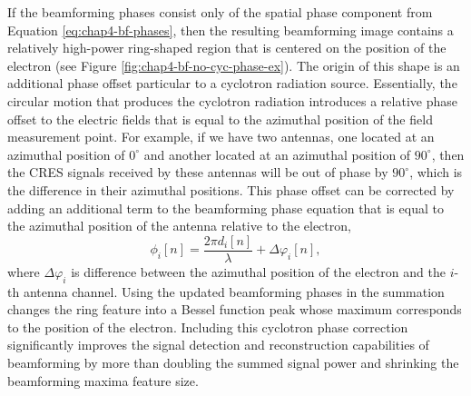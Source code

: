 If the beamforming phases consist only of the spatial phase component from Equation \ref{eq:chap4-bf-phases}, then the resulting beamforming image contains a relatively high-power ring-shaped region that is centered on the position of the electron (see Figure \ref{fig:chap4-bf-no-cyc-phase-ex}). The origin of this shape is an additional phase offset particular to a cyclotron radiation source. Essentially, the circular motion that produces the cyclotron radiation introduces a relative phase offset to the electric fields that is equal to the azimuthal position of the field measurement point. For example, if we have two antennas, one located at an azimuthal position of $0^\circ$ and another located at an azimuthal position of $90^\circ$, then the CRES signals received by these antennas will be out of phase by $90^\circ$, which is the difference in their azimuthal positions. This phase offset can be corrected by adding an additional term to the beamforming phase equation that is equal to the azimuthal position of the antenna relative to the electron, 
\begin{equation}
    \phi_i[n] = \frac{2\pi d_i[n]}{\lambda} + \Delta\varphi_i[n],
\end{equation}
where $\Delta\varphi_i$ is difference between the azimuthal position of the electron and the $i$-th antenna channel. Using the updated beamforming phases in the summation changes the ring feature into a Bessel function peak whose maximum corresponds to the position of the electron. Including this cyclotron phase correction significantly improves the signal detection and reconstruction capabilities of beamforming by more than doubling the summed signal power and shrinking the beamforming maxima feature size. 

